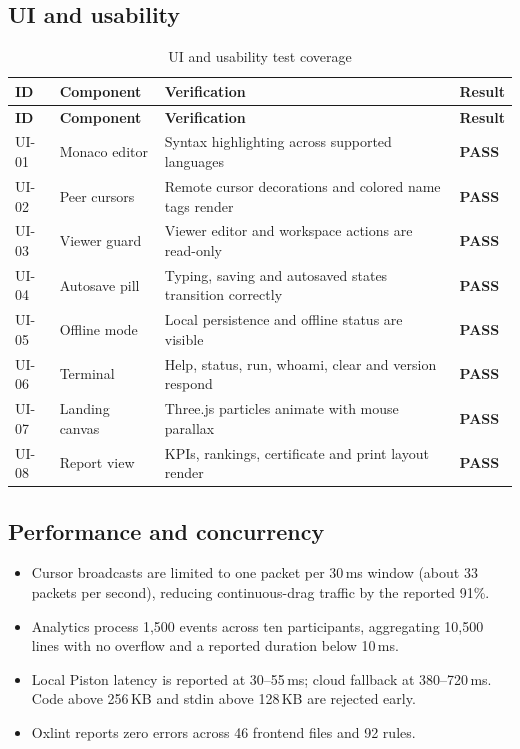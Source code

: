\documentclass[11pt,a4paper]{article}
\newcommand{\pass}{\textcolor{passgreen}{\textbf{PASS}}}
\newcommand{\tableheader}[1]{\textbf{#1}}
\begin{document}
\subsection{UI and usability}
\scriptsize
\begin{xltabular}{\textwidth}{L{1.1cm} L{3.0cm} Y C{1.5cm}}
\caption{UI and usability test coverage}\label{tab:ui}\\
\toprule
{}
\tableheader{ID} & \tableheader{Component} & \tableheader{Verification} & \tableheader{Result}\\
\midrule
\endfirsthead
\toprule
{}
\tableheader{ID} & \tableheader{Component} & \tableheader{Verification} & \tableheader{Result}\\
\midrule
\endhead
UI-01 & Monaco editor & Syntax highlighting across supported languages & \pass\\
UI-02 & Peer cursors & Remote cursor decorations and colored name tags render & \pass\\
UI-03 & Viewer guard & Viewer editor and workspace actions are read-only & \pass\\
UI-04 & Autosave pill & Typing, saving and autosaved states transition correctly & \pass\\
UI-05 & Offline mode & Local persistence and offline status are visible & \pass\\
UI-06 & Terminal & Help, status, run, whoami, clear and version respond & \pass\\
UI-07 & Landing canvas & Three.js particles animate with mouse parallax & \pass\\
UI-08 & Report view & KPIs, rankings, certificate and print layout render & \pass\\
\bottomrule
\end{xltabular}
\normalsize

\subsection{Performance and concurrency}
\begin{itemize}
    \item Cursor broadcasts are limited to one packet per 30\,ms window (about 33
    packets per second), reducing continuous-drag traffic by the reported 91\%.
    \item Analytics process 1,500 events across ten participants, aggregating 10,500
    lines with no overflow and a reported duration below 10\,ms.
    \item Local Piston latency is reported at 30--55\,ms; cloud fallback at
    380--720\,ms. Code above 256\,KB and stdin above 128\,KB are rejected early.
    \item Oxlint reports zero errors across 46 frontend files and 92 rules.
\end{itemize}
\end{document}
